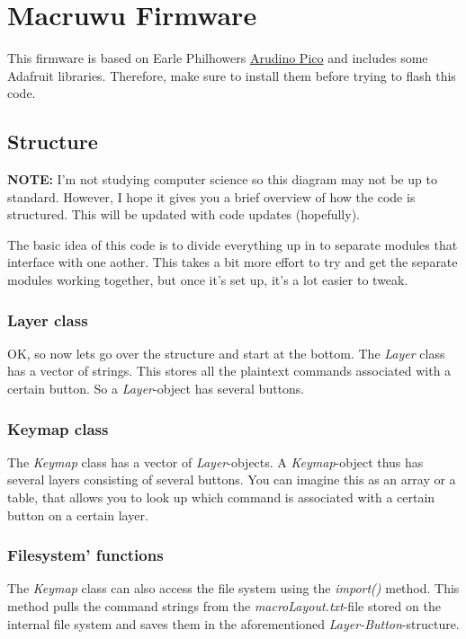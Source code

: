 \documentclass[english, 12pt]{scrartcl}
\begin{document}
	\section{Macruwu Firmware}
	This firmware is based on Earle Philhowers \href{https://github.com/earlephilhower/arduino-pico}{Arudino Pico} and includes some Adafruit libraries. Therefore, make sure to install them before trying to flash this code.
	\subsection{Structure}
	\textbf{NOTE:} I'm not studying computer science so this diagram may not be up to standard. However, I hope it gives you a brief overview of how the code is structured. This will be updated with code updates (hopefully).\newline
	\begin{minipage}{\linewidth}
		\centering
		\resizebox{0.5\textheight}{!}{}
	\end{minipage}
	\newline
	\newline
	The basic idea of this code is to divide everything up in to separate modules that interface with one aother. This takes a bit more effort to try and get the separate modules working together, but once it's set up, it's a lot easier to tweak.
	\subsubsection{Layer class}
	OK, so now lets go over the structure and start at the bottom. The \textit{Layer} class has a vector of strings. This stores all the plaintext commands associated with a certain button. So a \textit{Layer}-object has several buttons.
	\subsubsection{Keymap class}
	The \textit{Keymap} class has a vector of \textit{Layer}-objects. A \textit{Keymap}-object thus has several layers consisting of several buttons. You can imagine this as an array or a table, that allows you to look up which command is associated with a certain button on a certain layer.
	\subsubsection{Filesystem' functions}
	The \textit{Keymap} class can also access the file system using the \textit{import()} method. This method pulls the command strings from the \textit{macroLayout.txt}-file stored on the internal file system and saves them in the aforementioned \textit{Layer-Button}-structure.
\end{document}
